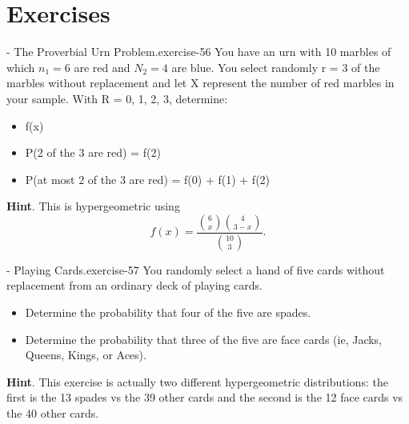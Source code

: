 \documentclass[10pt,]{book}
\numberwithin{equation}{section}
\begin{document}
\section[{Exercises}]{Exercises}\label{section-44}
\hypertarget{p-855}{}%
\begin{inlineexercise}{- The Proverbial Urn Problem.}{exercise-56}%
\hypertarget{p-856}{}%
You have an urn with 10 marbles of which \(n_1 = 6\) are red and \(N_2 = 4\) are blue. You select randomly r = 3 of the marbles without replacement and let X represent the number of red marbles in your sample. With R = {0, 1, 2, 3}, determine: \leavevmode%
\begin{itemize}[label=\textbullet]
\item{}f(x)%
\item{}P(2 of the 3 are red) = f(2)%
\item{}P(at most 2 of the 3 are red) = f(0) + f(1) + f(2)%
\end{itemize}
%
\par\smallskip%
\noindent\textbf{Hint}.\hypertarget{hint-3}{}\quad%
\hypertarget{p-857}{}%
This is hypergeometric using%
\begin{equation*}
f(x) = \frac{\binom{6}{x} \binom{4}{3-x}}{\binom{10}{3}}.
\end{equation*}
%
\end{inlineexercise}
%
\par
\hypertarget{p-858}{}%
\begin{inlineexercise}{- Playing Cards.}{exercise-57}%
\hypertarget{p-859}{}%
You randomly select a hand of five cards without replacement from an ordinary deck of playing cards. \leavevmode%
\begin{itemize}[label=\textbullet]
\item{}Determine the probability that four of the five are spades.%
\item{}Determine the probability that three of the five are face cards (ie, Jacks, Queens, Kings, or Aces).%
\end{itemize}
%
\par\smallskip%
\noindent\textbf{Hint}.\hypertarget{hint-4}{}\quad%
\hypertarget{p-860}{}%
This exercise is actually two different hypergeometric distributions: the first is the 13 spades vs the 39 other cards and the second is the 12 face cards vs the 40 other cards.%
\end{inlineexercise}
%
\par
\hypertarget{p-861}{}%
\end{document}

